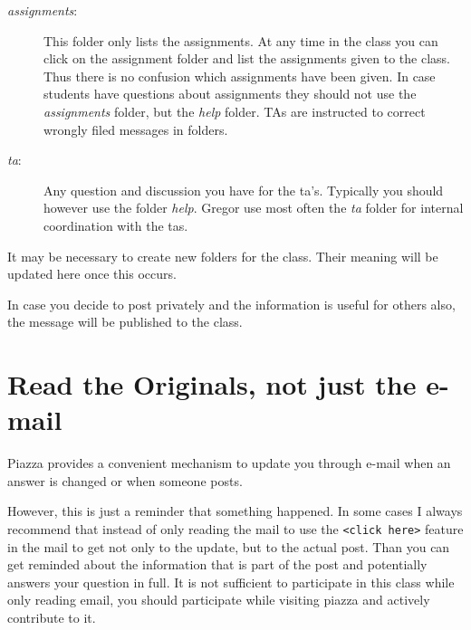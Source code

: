 \begin{description}
\item[\emph{assignments}:]
This folder only lists the assignments. At any time in the class you can
click on the assignment folder and list the assignments given to the
class. Thus there is no confusion which assignments have been given. In
case students have questions about assignments they should not use the
\emph{assignments} folder, but the \emph{help} folder. TAs are
instructed to correct wrongly filed messages in folders.
\item[\emph{ta}:]
Any question and discussion you have for the ta's. Typically you should
however use the folder \emph{help}. Gregor use most often the \emph{ta}
folder for internal coordination with the tas.
\end{description}

It may be necessary to create new folders for the class. Their meaning
will be updated here once this occurs.

In case you decide to post privately and the information is useful for
others also, the message will be published to the class.


\section{Read the Originals, not just the e-mail}

Piazza provides a convenient mechanism to update you through e-mail
when an answer is changed or when someone posts.


However, this is just a reminder that something happened. In some
cases I always recommend that instead of only reading the mail to use
the \verb|<click here>| feature in the mail to get not only to the update,
but to the actual post. Than you can get reminded about the 
information that is part of the post and potentially answers your
question in full. It is not sufficient to participate in this class
while only reading email, you should participate while visiting piazza
and actively contribute to it.


\begin{comment}
A convenient post with all folders that are useful to know is posted at:

  \URL{https://piazza.com/class/j5wll7vzylg25j?cid=103}

If you click on the foldername, you can see all posts in that folder.
\end{comment}

\begin{comment}
\section{Video about i523 Piazza}

A video on how piazza is used in i523 is shown at:

  \URL{https://youtu.be/9hnW-327CMQ}
\end{comment}

